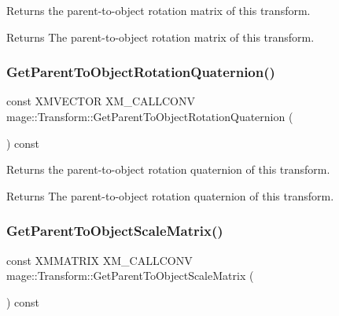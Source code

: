 Returns the parent-\/to-\/object rotation matrix of this transform.

\begin{DoxyReturn}{Returns}
The parent-\/to-\/object rotation matrix of this transform. 
\end{DoxyReturn}
\mbox{\label{classmage_1_1_transform_adb8a034a1abc3a7d0e2cfd92867596e2}} 
\subsubsection{\texorpdfstring{Get\+Parent\+To\+Object\+Rotation\+Quaternion()}{GetParentToObjectRotationQuaternion()}}
{\footnotesize\ttfamily const X\+M\+V\+E\+C\+T\+OR X\+M\+\_\+\+C\+A\+L\+L\+C\+O\+NV mage\+::\+Transform\+::\+Get\+Parent\+To\+Object\+Rotation\+Quaternion (\begin{DoxyParamCaption}{ }\end{DoxyParamCaption}) const\hspace{0.3cm}{\ttfamily [noexcept]}}

Returns the parent-\/to-\/object rotation quaternion of this transform.

\begin{DoxyReturn}{Returns}
The parent-\/to-\/object rotation quaternion of this transform. 
\end{DoxyReturn}
\mbox{\label{classmage_1_1_transform_a77a9313c62c19dd49c11f5fa30fa2ac5}} 
\subsubsection{\texorpdfstring{Get\+Parent\+To\+Object\+Scale\+Matrix()}{GetParentToObjectScaleMatrix()}}
{\footnotesize\ttfamily const X\+M\+M\+A\+T\+R\+IX X\+M\+\_\+\+C\+A\+L\+L\+C\+O\+NV mage\+::\+Transform\+::\+Get\+Parent\+To\+Object\+Scale\+Matrix (\begin{DoxyParamCaption}{ }\end{DoxyParamCaption}) const\hspace{0.3cm}{\ttfamily [noexcept]}}

